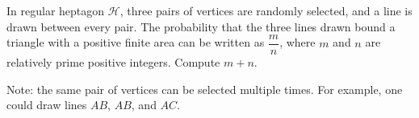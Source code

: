 In regular heptagon $\mathcal{H}$, three pairs of vertices are randomly selected, and a line is drawn between every pair. The probability that the three lines drawn bound a triangle with a positive finite area can be written as $\dfrac{m}{n}$, where $m$ and $n$ are relatively prime positive integers. Compute $m+n$.

Note: the same pair of vertices can be selected multiple times. For example, one could draw lines $AB$, $AB$, and $AC$.
